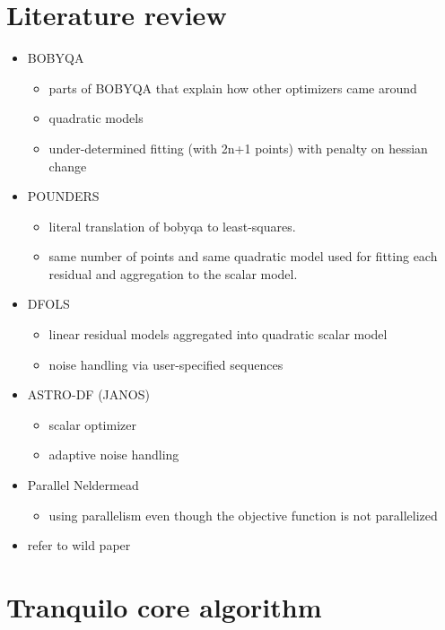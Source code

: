 \section{Literature review}
\begin{itemize}
    \item BOBYQA
        \begin{itemize}
            \item parts of BOBYQA that explain how other optimizers came around
            \item quadratic models
            \item under-determined fitting (with 2n+1 points) with penalty on hessian change
        \end{itemize}
        \item POUNDERS
            \begin{itemize}
                \item literal translation of bobyqa to least-squares.
                \item same number of points and same quadratic model used for fitting each residual and aggregation to the scalar model.
            \end{itemize}
        \item DFOLS
            \begin{itemize}
                \item linear residual models aggregated into quadratic scalar model
                \item noise handling via user-specified sequences
            \end{itemize}
    \item ASTRO-DF (JANOS)
            \begin{itemize}
                \item scalar optimizer
                \item adaptive noise handling
            \end{itemize}
    \item Parallel Neldermead
            \begin{itemize}
                \item using parallelism even though the objective function is not parallelized
            \end{itemize}
    \item refer to wild paper
\end{itemize}




\section{Tranquilo core algorithm}


